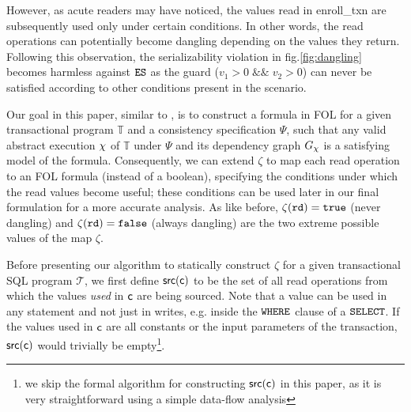 \documentclass{vldb}
\begin{document}
However, as acute readers may have noticed, 
the values read in enroll\_txn are subsequently used only under certain conditions.
In other words, the read operations can potentially become dangling
depending on the values they return. Following this observation, the
serializability violation in fig.\ref{fig:dangling} becomes harmless against $\texttt{ES}$ as the
guard ($v_1>0 \;\&\&\; v_2>0 $) can never be satisfied according to other
conditions present in the scenario.


Our goal in this paper, similar to \cite{Nagar:ser}, is to
construct a formula in FOL for a 
given transactional program $\mathbb{T}$ and a consistency
specification $\Psi$, such that any valid abstract execution
$\chi$ of $\mathbb{T}$ under $\Psi$ 
and its dependency
graph $G_\chi$ is a satisfying model of the formula. Consequently, we
can extend $\zeta$ to map each read operation to an FOL formula
(instead of a boolean), specifying the
conditions under which the read values become useful; 
these conditions
can be used later in our final formulation for a more accurate
analysis. 
As like before, $\mathtt{\zeta}(\texttt{rd})=\texttt{true}$ (never dangling) and 
$\mathtt{\zeta}(\texttt{rd})=\texttt{false}$ (always dangling) are the 
two extreme possible values of the map $\zeta$.

Before presenting our algorithm to statically construct $\zeta$
for a given transactional SQL program $\mathcal{T}$, we first define $\mathsf{src}(\mathsf{c})$ to be the set
of all read operations from which the values \emph{used} in $\mathsf{c}$ are being sourced. 
Note that a value can be used in any statement and not just in writes, e.g. inside the 
$\mathtt{WHERE}$ clause of a $\mathtt{SELECT}$.
If the values used in $\mathsf{c}$ are all constants or 
the input parameters of the transaction,
$\mathsf{src(\mathsf{c})}$ would trivially be empty\footnote{
we skip the formal algorithm for
 constructing $\mathsf{src(\mathsf{c})}$ in this paper,
as it is very straightforward using a simple data-flow analysis}.
\end{document}
